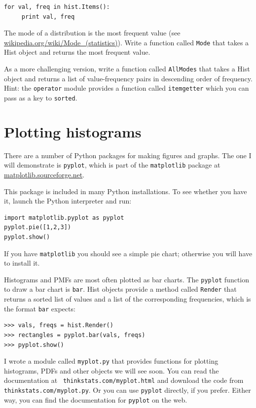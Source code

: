 \documentclass[12pt]{book}
\begin{document}
\begin{verbatim}
for val, freq in hist.Items():
     print val, freq
\end{verbatim}

\begin{ex}

The mode of a distribution is the most frequent value (see
\url{wikipedia.org/wiki/Mode_(statistics)}).  Write a function called
    {\tt Mode} that takes a Hist object and returns the most frequent
    value.

As a more challenging version, write a function called {\tt AllModes}
that takes a Hist object and returns a list of value-frequency
pairs in descending order of frequency.  Hint: the {\tt operator}
module provides a function called {\tt itemgetter} which you can
pass as a key to {\tt sorted}.

\end{ex}


\section{Plotting histograms}

There are a number of Python packages for making figures and graphs.
The one I will demonstrate is {\tt pyplot}, which is part of
the {\tt matplotlib} package at \url{matplotlib.sourceforge.net}.

This package is included in many Python installations.  To see whether
you have it, launch the Python interpreter and run:

\begin{verbatim}
import matplotlib.pyplot as pyplot
pyplot.pie([1,2,3])
pyplot.show()
\end{verbatim}

If you have {\tt matplotlib} you should see a simple pie chart;
otherwise you will have to install it.

Histograms and PMFs are most often plotted as bar charts.  The
{\tt pyplot} function to draw a bar chart is {\tt bar}.  Hist
objects provide a method called {\tt Render} that returns a sorted
list of values and a list of the corresponding frequencies, which
is the format {\tt bar} expects:

\begin{verbatim}
>>> vals, freqs = hist.Render()
>>> rectangles = pyplot.bar(vals, freqs)
>>> pyplot.show()
\end{verbatim}

I wrote a module called {\tt myplot.py} that provides functions
for plotting histograms, PDFs and other objects we will see soon.
You can read the documentation at {\tt
  thinkstats.com/myplot.html} and download the code from {\tt
  thinkstats.com/myplot.py}.  Or you can use
{\tt pyplot} directly, if you prefer.  Either way, you can find
the documentation for {\tt pyplot} on the web.
\end{document}
